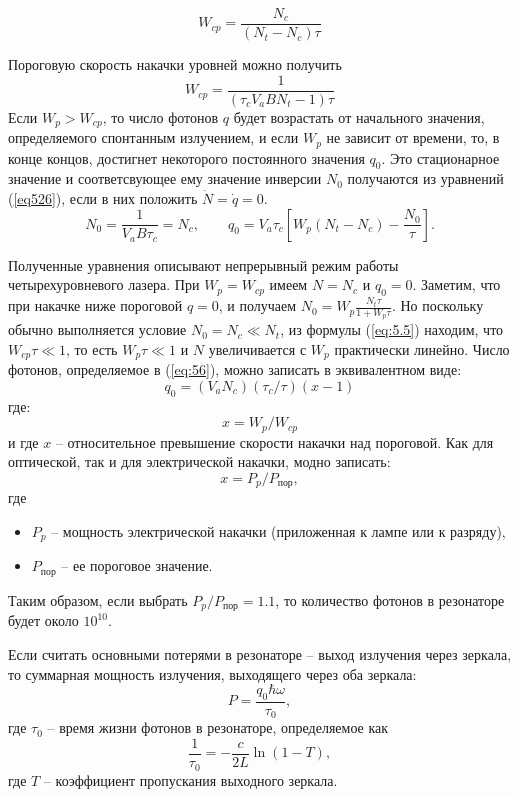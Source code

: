 \documentclass[a4paper, 12pt]{article}
\begin{document}
	\begin{equation}
		W_{cp}=\frac{N_c}{(N_t-N_c)\tau}
	\end{equation}
	\par
	Пороговую скорость накачки уровней можно получить
	\begin{equation}
		W_{cp}=\frac{1}{(\tau_cV_aBN_t-1)\tau}
		\label{eq:5.5}
	\end{equation}
	Если $W_p>W_{cp}$, то число фотонов $q$ будет возрастать от начального значения, определяемого спонтанным излучением, и если $W_p$ не зависит от времени, то, в конце концов, достигнет некоторого постоянного значения $q_0$. Это стационарное значение и соответсвующее ему значение инверсии $N_0$ получаются из уравнений (\ref{eq526}), если в них положить $\dot N=\dot q=0$.
	\begin{equation}
		N_0=\frac{1}{V_aB\tau_c}=N_c,\qquad
		q_0=V_a\tau_c\left[W_p\left(N_t-N_c\right)-\frac{N_0}{\tau}\right].
		\label{eq:56}
	\end{equation}
	\par
	Полученные уравнения описывают непрерывный режим работы четырехуровневого лазера. При $W_p=W_{cp}$ имеем $N=N_c$ и $q_0=0$. Заметим, что при накачке ниже пороговой $q=0$, и получаем $N_0=W_p\frac{N_t\tau}{1+W_p\tau}$. Но поскольку обычно выполняется условие $N_0=N_c\ll N_t$, из формулы (\ref{eq:5.5}) находим, что $W_{cp}\tau\ll 1$, то есть $W_p\tau\ll 1$ и $N$ увеличивается с $W_p$ практически линейно. Число фотонов, определяемое в (\ref{eq:56}), можно записать в эквивалентном виде:
	\begin{equation}
		q_0=\left(V_aN_c\right)\left(\tau_c/\tau\right)\left(x-1\right)
	\end{equation}
	где:
	\begin{equation}
		x=W_p/W_{cp}
	\end{equation}
	и где $x$ -- относительное превышение скорости накачки над пороговой. Как для оптической, так и для электрической накачки, модно записать:
	\begin{equation}
		x=P_p/P_{\text{пор}},
	\end{equation}
	где
	\begin{itemize}[noitemsep]
		\item $P_p$ -- мощность электрической накачки (приложенная к лампе или к разряду),
		\item $P_{\text{пор}}$ -- ее пороговое значение.
	\end{itemize}
	Таким образом, если выбрать $P_p/P_{\text{пор}}=1.1$, то количество фотонов в резонаторе будет около $10^{10}$.\par
	Если считать основными потерями в резонаторе -- выход излучения через зеркала, то суммарная мощность излучения, выходящего через оба зеркала:
	\begin{equation}
		P=\frac{q_0\hbar\omega}{\tau_0},
	\end{equation}
	где $\tau_0$ -- время жизни фотонов в резонаторе, определяемое как
	\begin{equation}
		\frac{1}{\tau_0}=-\frac{c}{2L}\ln\left(1-T\right),
	\end{equation}
	где $T$ -- коэффициент пропускания выходного зеркала.
\end{document}
